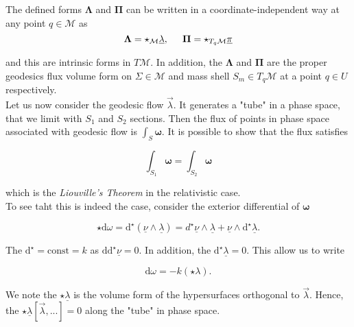 %
The defined forms $\boldsymbol{\Lambda}$ and $\boldsymbol{\Pi}$ can be written in a coordinate-independent way at any point $q\in\mathcal{M}$ as 
%
\begin{equation}
\boldsymbol{\Lambda} = \star_{\mathcal{M}}\underline{\lambda}, \hspace{5mm} \boldsymbol{\Pi} = \star_{T_q\mathcal{M}}\underline{\pi}
\end{equation}

and this are intrinsic forms in $T\mathcal{M}$. In addition, the $\boldsymbol{\Lambda}$ and $\boldsymbol{\Pi}$ are the proper geodesics flux
volume form on $\Sigma\in\mathcal{M}$ and mass shell $S_m\in T_q\mathcal{M}$ at a point $q\in U$ respectively. \\

Let us now consider the geodesic flow $\vec{\lambda}$. It generates a "tube" in a phase space, that we limit with $S_1$ and $S_2$ sections. Then the flux of points in phase space associated with geodesic flow is $\int_{S}\boldsymbol{\omega}$. It is possible to show that the flux satisfies

\begin{equation}
\int_{S_1}\boldsymbol{\omega} = \int_{S_2}\boldsymbol{\omega}
\label{eq:theory:liuville}
\end{equation}

which is the \textit{Liouville’s Theorem} in the relativistic case. \\

To see taht this is indeed the case, consider the exterior differential of $\boldsymbol{\omega}$

\begin{equation}
\star\text{d}\omega = \text{d}^{\star}(\underline{\nu}\wedge\underline{\lambda}) = d^{\star}\underline{\nu}\wedge\underline{\lambda} + \underline{\nu}\wedge\text{d}^{\star}\underline{\lambda}.
\end{equation}

The $\text{d}^{\star}=\text{const}=k$ as $\text{dd}^{\star}\underline{\nu}=0$. In addition, the $\text{d}^{\star}\underline{\lambda}=0$. This allow us to write 

\begin{equation}
\text{d}\omega = -k(\star\lambda).
\end{equation}

We note the $\star\underline{\lambda}$ is the volume form of the hypersurfaces orthogonal to $\vec{\lambda}$. Hence, the $\star\underline{\lambda}[\vec{\lambda},...]=0$ along the "tube" in phase space. 

